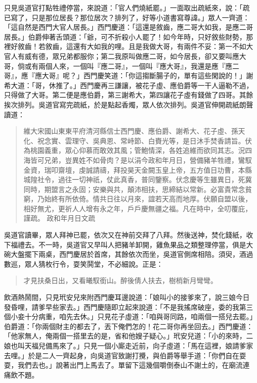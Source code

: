 只見吳道官打點牲禮停當，來說道：「官人們燒紙罷。」一面取出疏紙來，說：「疏已寫了，只是那位居長？那位居次？排列了，好等小道書寫尊諱。」眾人一齊道：「這自然是西門大官人居長。」西門慶道：「這還是敘齒，應二哥大如我，是應二哥居長。」伯爵伸著舌頭道：「爺，可不折殺小人罷了！如今年時，只好敘些財勢，那裡好敘齒！若敘齒，這還有大如我的哩。且是我做大哥，有兩件不妥：第一不如大官人有威有德，眾兄弟都服你；第二我原叫做應二哥，如今居長，卻又要叫應大哥，倘或有兩個人來，一個叫『應二哥』，一個叫『應大哥』，我還是應『應二哥』，應『應大哥』呢？」西門慶笑道：「你這搊斷腸子的，單有這些閑說的！」謝希大道：「哥，休推了。」西門慶再三謙讓，被花子虛、應伯爵等一干人逼勒不過，只得做了大哥。第二便是應伯爵，第三謝希大，第四讓花子虛有錢做了四哥。其餘挨次排列。吳道官寫完疏紙，於是點起香燭，眾人依次排列。吳道官伸開疏紙朗聲讀道：
\begin{quote}
維大宋國山東東平府清河縣信士西門慶、應伯爵、謝希大、花子虛、孫天化、祝念實、雲理守、吳典恩、常峙節、白賚光等，是日沐手焚香請旨。伏為桃園義重，眾心仰慕而敢效其風；管鮑情深，各姓追維而欲同其志。況四海皆可兄弟，豈異姓不如骨肉？是以涓今政和年月日，營備豬羊牲禮，鸞馭金資，瑞叩齋壇，虔誠請禱，拜投昊天金闕玉皇上帝，五方值日功曹，本縣城隍社令，過往一切神祇，仗此真香，普同鑒察。伏念慶等生雖異日，死冀同時，期盟言之永固；安樂與共，顛沛相扶，思締結以常新。必富貴常念貧窮，乃始終有所依倚。情共日往以月來，誼若天高而地厚。伏願自盟以後，相好無尤，更祈人人增有永之年，戶戶慶無疆之福。凡在時中，全叨覆庇，謹疏。
政和年月日文疏
\end{quote}

吳道官讀畢，眾人拜神已罷，依次又在神前交拜了八拜。然後送神，焚化錢紙，收下福禮去。不一時，吳道官又早叫人把豬羊卸開，雞魚果品之類整理停當，俱是大碗大盤擺下兩桌，西門慶居於首席，其餘依次而坐，吳道官側席相陪。須臾，酒過數巡，眾人猜枚行令，耍笑鬨堂，不必細說。正是：
\begin{quote}
才見扶桑日出，又看曦馭銜山。醉後倩人扶去，樹梢新月彎彎。
\end{quote}

飲酒熱鬧間，只見玳安兒來附西門慶耳邊說道：「娘叫小的接爹來了，說三娘今日發昏哩，請爹早些家去。」西門慶隨即立起來說道：「不是我搖席破座，委的我第三個小妾十分病重，咱先去休。」只見花子虛道：「咱與哥同路，咱兩個一搭兒去罷。」伯爵道：「你兩個財主的都去了，丟下俺們怎的！花二哥你再坐回去。」西門慶道：「他家無人，俺兩個一搭里去的是，省和他嫂子疑心。」玳安兒道：「小的來時，二娘也叫天福兒備馬來了。」只見一個小廝走近前，向子虛道：「馬在這裡，娘請爹家去哩。」於是二人一齊起身，向吳道官致謝打攪，與伯爵等舉手道：「你們自在耍耍，我們去也。」說著出門上馬去了。單留下這幾個嚼倒泰山不謝土的，在廟流連痛飲不題。

